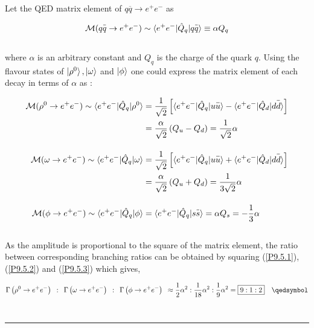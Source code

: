 \begin{solution}
Let the QED matrix element of $q\overbar{q}\to e^+e^-$ as 

\begin{align*}
    \mathcal{M}(q\overbar{q}\to e^+e^-) \sim \braket{e^+e^-|\hat{Q}_q|q\overbar{q}} \equiv \alpha Q_q
\end{align*}\\
where $\alpha$ is an arbitrary constant and $Q_q$ is the charge of the quark $q$. Using the flavour states of $\ket{\rho^0},\ket{\omega}$ and $\ket{\phi}$ one could express the matrix element of each decay in terms of $\alpha$ as :

\begin{align}
    \mathcal{M}(\rho^0\to e^+e^-) \sim \braket{e^+e^-|\hat{Q}_q|\rho^0} &= \frac{1}{\sqrt{2}} \left[ \braket{e^+e^-|\hat{Q}_q|u\overbar{u}} - \braket{e^+e^-|\hat{Q}_d|d\overbar{d}} \right] \nonumber  \\
    &=  \frac{\alpha}{\sqrt{2}} \left( Q_u -Q_d \right) =  \frac{1}{\sqrt{2}} \alpha \label{P9.5.1} \\[0.15in]
    \mathcal{M}(\omega\to e^+e^-) \sim \braket{e^+e^-|\hat{Q}_q|\omega} &= \frac{1}{\sqrt{2}} \left[ \braket{e^+e^-|\hat{Q}_q|u\overbar{u}} + \braket{e^+e^-|\hat{Q}_d|d\overbar{d}} \right] \nonumber \\
    &=  \frac{\alpha}{\sqrt{2}} \left( Q_u + Q_d \right) =  \frac{1}{3\sqrt{2}} \alpha \label{P9.5.2} \\[0.15in]
    \mathcal{M}(\phi\to e^+e^-) \sim \braket{e^+e^-|\hat{Q}_q|\phi} &=  \braket{e^+e^-|\hat{Q}_q|s\overbar{s}}  = \alpha Q_s = -\frac{1}{3}\alpha \label{P9.5.3}
\end{align}\\
As the amplitude is proportional to the square of the matrix element, the ratio between corresponding branching ratios can be obtained by squaring (\ref{P9.5.1}), (\ref{P9.5.2}) and (\ref{P9.5.3}) which gives, 

\begin{align*}
    \Gamma \left( \rho^0 \to e^+e^- \right) \spc  : \spc   \Gamma \left( \omega \to  e^+e^- \right) \spc : \spc   \Gamma \left( \phi \to e^+e^- \right) \spc \approx \frac{1}{2}\alpha^2 : \frac{1}{18} \alpha^2 : \frac{1}{9} \alpha^2 = \boxed{9:1:2} \qed 
\end{align*}\\
\end{solution}

\noindent\rule{7in}{1.5pt}

